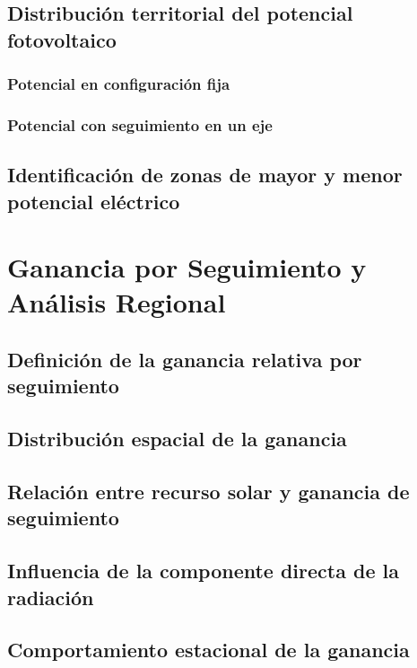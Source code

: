 \documentclass[11pt,a4paper]{article}
\begin{document}
\subsection{Distribución territorial del potencial fotovoltaico}
\subsubsection{Potencial en configuración fija}
\subsubsection{Potencial con seguimiento en un eje}

\subsection{Identificación de zonas de mayor y menor potencial eléctrico}



\section{Ganancia por Seguimiento y Análisis Regional}

\subsection{Definición de la ganancia relativa por seguimiento}

\subsection{Distribución espacial de la ganancia}

\subsection{Relación entre recurso solar y ganancia de seguimiento}

\subsection{Influencia de la componente directa de la radiación}

\subsection{Comportamiento estacional de la ganancia}
\end{document}
